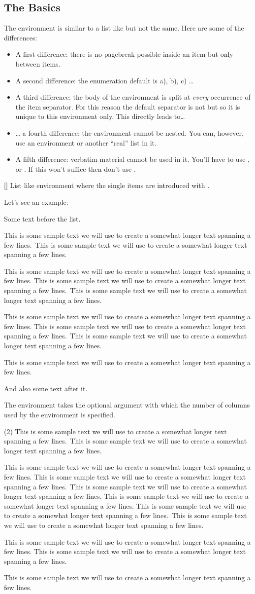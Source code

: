 \documentclass[load-preamble+]{cnltx-doc}
\newcommand*\sample{This is some sample text we will use to create a somewhat
  longer text spanning a few lines.}
\newcommand*\Sample{\sample\ \sample\par\sample}
\begin{document}
\subsection{The Basics}
The  environment is similar to a list like  but not
the same.  Here are some of the differences:
\begin{itemize}
  \item A first difference: there is no pagebreak possible inside an item but
    only between items.
  \item A second difference: the enumeration default is a), b), c) \ldots
  \item A third difference: the body of the  environment is split
    at \emph{every} occurrence of the item separator.  For this reason the
    default separator is not  but  so it is unique to this
    environment only.  This directly leads to\ldots
  \item \ldots{} a fourth difference: the  environment cannot be
    nested.  You can, however, use an  environment or another
    \enquote{real} list in it.
  \item A fifth difference: verbatim material cannot be used in it.  You'll
    have to use ,  or .  If this
    won't suffice then don't use .
\end{itemize}

\begin{environments}
  []
    List like environment where the single items are introduced with
    .
\end{environments}
Let's see an example:
\begin{example}
  Some text before the list.
  \begin{tasks}
    \task \Sample
    \task \Sample
    \task \Sample
  \end{tasks}
  And also some text after it.
\end{example}

The environment takes the optional argument  with which
the number of columns used by the environment is specified.
\begin{example}
  \begin{tasks}(2)
    \task \Sample
    \task \sample\ \sample
    \task \sample
    \task \Sample
    \task \sample\par\sample
  \end{tasks}
\end{example}
\end{document}
